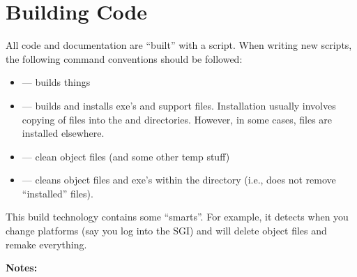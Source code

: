 
\section{Building Code}
\label{Building Code}

All code and documentation are ``built'' with a  script.
When writing new  scripts, the following 
command conventions should be followed:

\begin{itemize}
\item
{} --- builds things
\item
{} --- builds and installs exe's and support files.
Installation usually involves copying of files into the
 and  directories.
However, in some cases, files are installed elsewhere.
\item
{} --- clean object files (and some other temp stuff)
\item
{} --- cleans object files and exe's within
the  directory (i.e., does not remove ``installed''
files).
\end{itemize}

This build technology contains some ``smarts''.
For example, it detects when you change platforms (say you log into the
SGI) and will delete object files and remake everything.

\noindent
{\bf Notes:}

